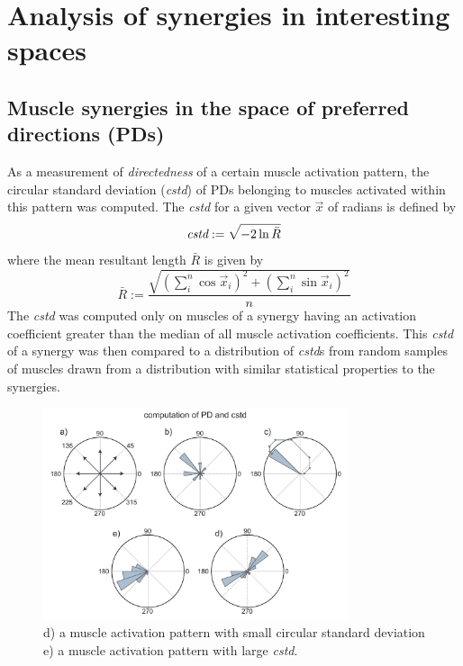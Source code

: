\section{Analysis of synergies in interesting spaces} %
\label{sg:sec:syn_comp}


\subsection{Muscle synergies in the space of preferred directions (PDs)} %
\label{sg:sub:pd}

As a measurement of \emph{directedness} of a certain muscle activation pattern, the circular standard deviation (\emph{cstd}) of PDs belonging to muscles activated within this pattern was computed. The \emph{cstd} for a given vector $\vec{x}$ of radians is defined by 
\begin{equation}
	\emph{cstd} := \sqrt{-2 \ln{\bar{R}}}
\end{equation}
where the mean resultant length $\bar{R}$ is given by 
\begin{equation}
	\bar{R} := \frac
					{ \sqrt{ {(\sum_{i}^n \cos  \vec{x}_i)}^2 + {(\sum_{i}^n \sin \vec{x}_i)}^2 }}
					{n}
\end{equation}
The \emph{cstd} was computed only on muscles of a synergy having an activation coefficient greater than the median of all muscle activation coefficients. This \emph{cstd} of a synergy was then compared
to a distribution of \emph{cstd}s from random samples of muscles drawn from a distribution with similar statistical properties to the synergies.


\begin{figure}[ht]
	\centering
		\includegraphics[width=0.8\textwidth]{images/cstd_pd.pdf}
	\caption
	{
	d) a muscle activation pattern with small circular standard deviation \\
	e) a muscle activation pattern with large \emph{cstd}.
	}
	\label{sg:fig:images_cstd_pd}
\end{figure}

